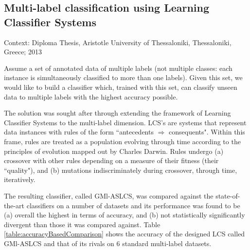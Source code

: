 \subsection{Multi-label classification using Learning Classifier Systems}

Context: Diploma Thesis, Aristotle University of Thessaloniki, Thessaloniki, Greece; 2013\\

\begin{problem}
Assume a set of annotated data of multiple labels (not
multiple classes: each instance is simultaneously classified to more than one
labels). Given this set, we would like to build a classifier which, trained with
this set, can classify unseen data to multiple labels with the highest accuracy
possible.
\end{problem}

The solution was sought after through extending the framework of Learning
Classifier Systems to the multi-label dimension. LCS's are systems that
represent data instances with rules of the form ``antecedents $\Rightarrow$
consequents". Within this frame, rules are treated as a population evolving
through time according to the principles of evolution mapped out by Charles
Darwin. Rules undergo (a) crossover with other rules depending on a measure of
their fitness (their ``quality"), and (b) mutations indiscriminately during
crossover, through time, iteratively.

The resulting classifier, called GMl-ASLCS, was compared against the
state-of-the-art classifiers on a number of datasets and its performance was
found to be (a) overall the highest in terms of accuracy, and (b) not
statistically significantly divergent than those it was compared against. Table
\ref{table:accuracyBasedComparison} shows the accuracy of the designed LCS
called GMl-ASLCS and that of its rivals on 6 standard multi-label datasets.

